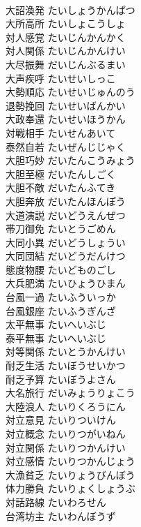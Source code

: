 \documentclass[8pt]{extreport}
\begin{document}
\begin{CJK}{UTF8}{min}
\\	大詔渙発	たいしょうかんぱつ	
\\	大所高所	たいしょこうしょ	
\\	対人感覚	たいじんかんかく	
\\	対人関係	たいじんかんけい	
\\	大尽振舞	だいじんぶるまい	
\\	大声疾呼	たいせいしっこ	
\\	大勢順応	たいせいじゅんのう	
\\	退勢挽回	たいせいばんかい	
\\	大政奉還	たいせいほうかん	
\\	対戦相手	たいせんあいて	
\\	泰然自若	たいぜんじじゃく	
\\	大胆巧妙	だいたんこうみょう	
\\	大胆至極	だいたんしごく	
\\	大胆不敵	だいたんふてき	
\\	大胆奔放	だいたんほんぽう	
\\	大道演説	だいどうえんぜつ	
\\	帯刀御免	たいとうごめん	
\\	大同小異	だいどうしょうい	
\\	大同団結	だいどうだんけつ	
\\	態度物腰	たいどものごし	
\\	大兵肥満	たいひょうひまん	
\\	台風一過	たいふういっか	
\\	台風銀座	たいふうぎんざ	
\\	太平無事	たいへいぶじ	
\\	泰平無事	たいへいぶじ	
\\	対等関係	たいとうかんけい	
\\	耐乏生活	たいぼうせいかつ	
\\	耐乏予算	たいぼうよさん	
\\	大名旅行	だいみょうりょこう	
\\	大陸浪人	たいりくろうにん	
\\	対立意見	たいりついけん	
\\	対立概念	たいりつがいねん	
\\	対立関係	たいりつかんけい	
\\	対立感情	たいりつかんじょう	
\\	大漁貧乏	たいりょうびんぼう	
\\	体力勝負	たいりょくしょうぶ	
\\	対話路線	たいわろせん	
\\	台湾坊主	たいわんぼうず	

\end{CJK}
\end{document}
